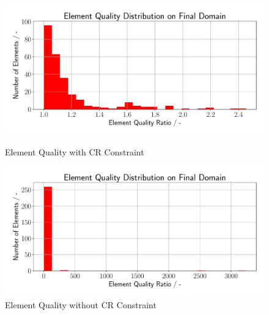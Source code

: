 \begin{figure}[h]
    \begin{minipage}{.5\textwidth}
        \centering
        \includegraphics[width=1\textwidth]{figures/element_quality_hist.pdf}
        \caption{Element Quality with CR Constraint}
        \label{plot_ref_element_good}
    \end{minipage}
    \begin{minipage}{.5\textwidth}
        \centering
        \includegraphics[width=1\textwidth]{figures/element_quality_hist_bad.pdf}
        \caption{Element Quality without CR Constraint}
        \label{plot_ref_element_bad}
    \end{minipage}
\end{figure}

